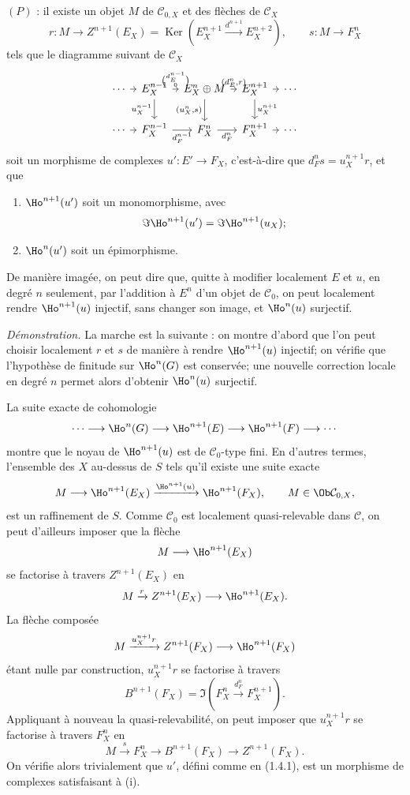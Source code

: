 \documentclass[11pt]{article}
\providecommand{\Ker}{\operatorname{Ker}}
\begin{document}
\((P)\) : il existe un objet \(M\) de \(\mathcal C_{0,X}\) et des flèches de \(\mathcal C_X\)
\[
  r:M\longrightarrow Z^{n+1}(E_X)=
  \Ker\!\left(E_X^{n+1}\xrightarrow{d^{n+1}}E_X^{n+2}\right),
  \qquad
  s:M\longrightarrow F_X^n
\]
tels que le diagramme suivant de \(\mathcal C_X\)
\[
\begin{tikzcd}[column sep=tiny]
\cdots \arrow[r] & E_X^{n-1}
 \arrow[r,"{\binom{d_E^{n-1}}{0}}"]
 \arrow[d,"u_X^{n-1}"'] &
E_X^n\oplus M
 \arrow[r,"{(d_E^n,r)}"]
 \arrow[d,"{(u_X^n,s)}"'] &
E_X^{n+1} \arrow[r] \arrow[d,"u_X^{n+1}"] &
\cdots\\
\cdots \arrow[r] & F_X^{n-1} \arrow[r,"d_F^{n-1}"'] &
F_X^n \arrow[r,"d_F^n"'] &
F_X^{n+1} \arrow[r] &
\cdots
\end{tikzcd}
\]
soit un morphisme de complexes \(u':E'\to F_X\), c'est-à-dire que \(d_F^n s=u_X^{n+1}r\), et que
\begin{enumerate}[label=(\roman*)]
\item \(\Ho^{n+1}(u')\) soit un monomorphisme, avec
\[
  \Im\Ho^{n+1}(u')=\Im\Ho^{n+1}(u_X);
\]
\item \(\Ho^n(u')\) soit un épimorphisme.
\end{enumerate}

De manière imagée, on peut dire que, quitte à modifier localement \(E\) et \(u\), en degré \(n\) seulement, par l'addition à \(E^n\) d'un objet de \(\mathcal C_0\), on peut localement rendre \(\Ho^{n+1}(u)\) injectif, sans changer son image, et \(\Ho^n(u)\) surjectif.

\emph{Démonstration.} La marche est la suivante : on montre d'abord que l'on peut choisir localement \(r\) et \(s\) de manière à rendre \(\Ho^{n+1}(u)\) injectif; on vérifie que l'hypothèse de finitude sur \(\Ho^n(G)\) est conservée; une nouvelle correction locale en degré \(n\) permet alors d'obtenir \(\Ho^n(u)\) surjectif.

La suite exacte de cohomologie
\[
  \cdots\longrightarrow \Ho^n(G)\longrightarrow
  \Ho^{n+1}(E)\longrightarrow
  \Ho^{n+1}(F)\longrightarrow \cdots
\]
montre que le noyau de \(\Ho^{n+1}(u)\) est de \(\mathcal C_0\)-type fini. En d'autres termes, l'ensemble des \(X\) au-dessus de \(S\) tels qu'il existe une suite exacte
\[
  M\longrightarrow \Ho^{n+1}(E_X)
  \xrightarrow{\Ho^{n+1}(u)}
  \Ho^{n+1}(F_X),
  \qquad M\in\Ob\mathcal C_{0,X},
\]
est un raffinement de \(S\). Comme \(\mathcal C_0\) est localement quasi-relevable dans \(\mathcal C\), on peut d'ailleurs imposer que la flèche
\[
  M\longrightarrow \Ho^{n+1}(E_X)
\]
se factorise à travers \(Z^{n+1}(E_X)\) en
\[
  M\xrightarrow{r}Z^{n+1}(E_X)\longrightarrow \Ho^{n+1}(E_X).
\]
La flèche composée
\[
  M\xrightarrow{u_X^{n+1}r}Z^{n+1}(F_X)\longrightarrow \Ho^{n+1}(F_X)
\]
étant nulle par construction, \(u_X^{n+1}r\) se factorise à travers
\[
  B^{n+1}(F_X)=\Im\!\left(F_X^n\xrightarrow{d_F^n}F_X^{n+1}\right).
\]
Appliquant à nouveau la quasi-relevabilité, on peut imposer que \(u_X^{n+1}r\) se factorise à travers \(F_X^n\) en
\[
  M\xrightarrow{s}F_X^n\longrightarrow B^{n+1}(F_X)\longrightarrow Z^{n+1}(F_X).
\]
On vérifie alors trivialement que \(u'\), défini comme en (1.4.1), est un morphisme de complexes satisfaisant à (i).
\end{document}
